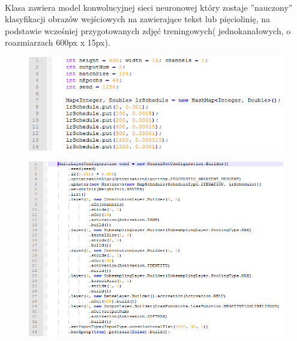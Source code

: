 \documentclass[a4paper,12pt]{article}
\begin{document}
	        \paragraph{} Klasa zawiera model konwolucyjnej sieci neuronowej który           zostaje ''nauczony'' klasyfikacji obrazów wejściowych na zawierające        tekst lub  pięciolinię, na podstawie wcześniej przygotowanych zdjęć         treningowych( jednokanałowych, o roazmiarzach 600px x 15px).
		
    		\begin{figure}[!ht]  
	    	    \begin{center}
	    		    \includegraphics[width=15cm, frame] {image//practicalPart//cnnConf_03.png} 
	    	    \end{center}
		    \end{figure}
                
	        \begin{figure}[!ht]  
    		    \begin{center}
    			    \includegraphics[width=15cm, frame] {image//practicalPart//cnnConf_04.png} 
    		    \end{center}
		    \end{figure}  
		
\end{document}

